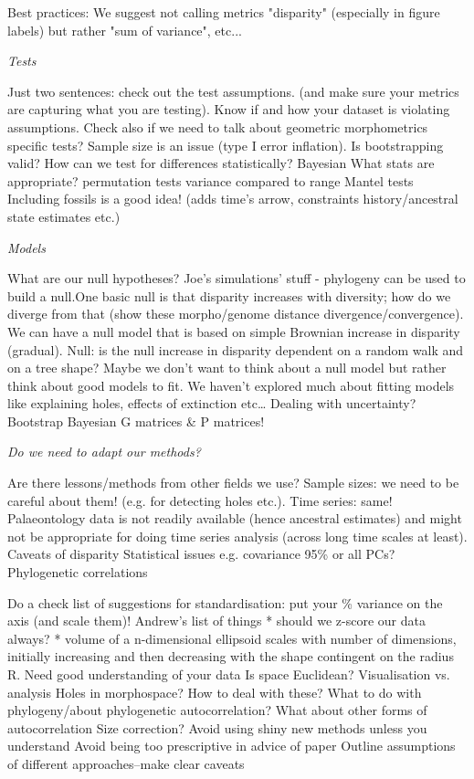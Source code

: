 \documentclass[12pt,letterpaper]{article}
\renewcommand{\subsection}[1]{%
\bigskip
\begin{center}
\begin{large}
\normalfont\itshape #1
\end{large}
\end{center}}
\begin{document}
Best practices:
We suggest not calling metrics "disparity" (especially in figure labels) but rather "sum of variance", etc...

\subsection{Tests}
Just two sentences: check out the test assumptions. (and make sure your metrics are capturing what you are testing). Know if and how your dataset is violating assumptions. Check also if we need to talk about geometric morphometrics specific tests?
Sample size is an issue (type I error inflation).
Is bootstrapping valid?
How can we test for differences statistically?
Bayesian
What stats are appropriate?
permutation tests
variance compared to range
Mantel tests
Including fossils is a good idea! (adds time’s arrow, constraints history/ancestral state estimates etc.)

\subsection{Models}
What are our null hypotheses?
Joe’s simulations’ stuff - phylogeny can be used to build a null.One basic null is that disparity increases with diversity; how do we diverge from that (show these morpho/genome distance divergence/convergence).
We can have a null model that is based on simple Brownian increase in disparity (gradual). 
Null: is the null increase in disparity dependent on a random walk and on a tree shape?
Maybe we don’t want to think about a null model but rather think about good models to fit. 
We haven’t explored much about fitting models like explaining holes, effects of extinction etc…
Dealing with uncertainty? Bootstrap Bayesian G matrices \& P matrices!


\subsection{Do we need to adapt our methods?}
Are there lessons/methods from other fields we use?
Sample sizes: we need to be careful about them! (e.g. for detecting holes etc.).
Time series: same! Palaeontology data is not readily available (hence ancestral estimates) and might not be appropriate for doing time series analysis (across long time scales at least).
Caveats of disparity
Statistical issues e.g. covariance
95\% or all PCs?
Phylogenetic correlations

Do a check list of suggestions for standardisation: put your \% variance on the axis (and scale them)!
Andrew’s list of things
* should we z-score our data always?
* volume of a n-dimensional ellipsoid scales with number of dimensions, initially increasing and then decreasing with the shape contingent on the radius R.
Need good understanding of your data
Is space Euclidean?
Visualisation vs. analysis
Holes in morphospace? How to deal with these?
What to do with phylogeny/about phylogenetic autocorrelation?
What about other forms of autocorrelation
Size correction?
Avoid using shiny new methods unless you understand
Avoid being too prescriptive in advice of paper
Outline assumptions of different approaches--make clear caveats
\end{document}
